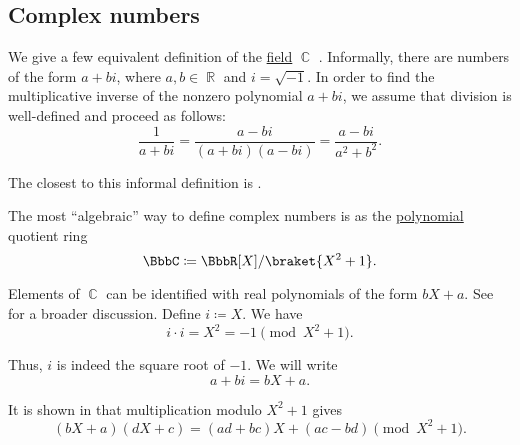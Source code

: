 \subsection{Complex numbers}\label{subsec:complex_numbers}

\begin{definition}\label{def:complex_numbers}
  We give a few equivalent definition of the \hyperref[def:field]{field} \( \BbbC \) . Informally, there are numbers of the form \( a + bi \), where \( a, b \in \BbbR \) and \( i = \sqrt{-1} \). In order to find the multiplicative inverse of the nonzero polynomial \( a + bi \), we assume that division is well-defined and proceed as follows:
  \begin{equation}\label{def:complex_numbers/inverse}
    \frac 1 {a + bi} = \frac {a - bi} {(a + bi)(a - bi)} = \frac{a - bi}{a^2 + b^2}.
  \end{equation}

  The closest to this informal definition is .

  \begin{thmenum}
     The most \enquote{algebraic} way to define complex numbers is as the \hyperref[def:polynomial_algebra]{polynomial} quotient ring
    \begin{equation*}
      \BbbC \coloneqq \BbbR[X] / \braket{X^2 + 1}.
    \end{equation*}

    Elements of \( \BbbC \) can be identified with real polynomials of the form \( bX + a \). See  for a broader discussion.
    Define \( i \coloneqq X \). We have
    \begin{equation*}
      i \cdot i = X^2 = -1 \pmod {X^2 + 1}.
    \end{equation*}

    Thus, \( i \) is indeed the square root of \( -1 \). We will write
    \begin{equation*}
      a + bi = bX + a.
    \end{equation*}

    It is shown in  that multiplication modulo \( X^2 + 1 \) gives
    \begin{equation}\label{def:complex_numbers/polynomials/multiplication}
      (bX + a) (dX + c) = (ad + bc)X + (ac - bd) \pmod {X^2 + 1}.
    \end{equation}


\end{thmenum}
\end{definition}
